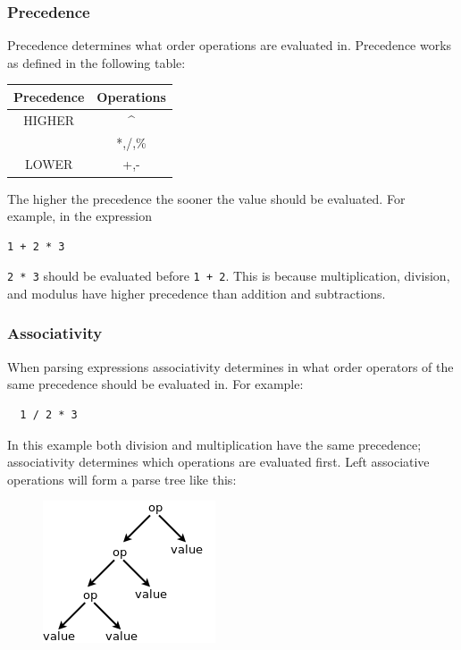 \documentclass{article}
\newcommand{\code}[1]{\texttt{\textmd{#1}}}
\begin{document}
\subsubsection{Precedence}
Precedence determines what order operations are evaluated in. Precedence works as defined in the
following table:
\begin{center}
  \begin{tabular}{|c|c|}
    \hline
    \textbf{Precedence} & \textbf{Operations} \\
    \hline
    HIGHER & \textasciicircum \\
           & *,/,\% \\
    LOWER  & +,- \\
    \hline
  \end{tabular}
\end{center}

The higher the precedence the sooner the value should be evaluated. For example, in the expression
\begin{lstlisting}
1 + 2 * 3
\end{lstlisting}
\code{2 * 3} should be evaluated before \code{1 + 2}. This is because multiplication, division, and modulus
have higher precedence than addition and subtractions.

\subsubsection{Associativity}
When parsing expressions associativity determines in what order operators of the same precedence
should be evaluated in. For example:
\begin{lstlisting}
  1 / 2 * 3
\end{lstlisting}

In this example both division and multiplication have the same precedence; associativity determines
which operations are evaluated first. Left associative operations will form a parse tree like this:
\begin{figure}[H]
  \centering
  \includegraphics{static/left-assoc-gen.png}
\end{figure}
\end{document}
